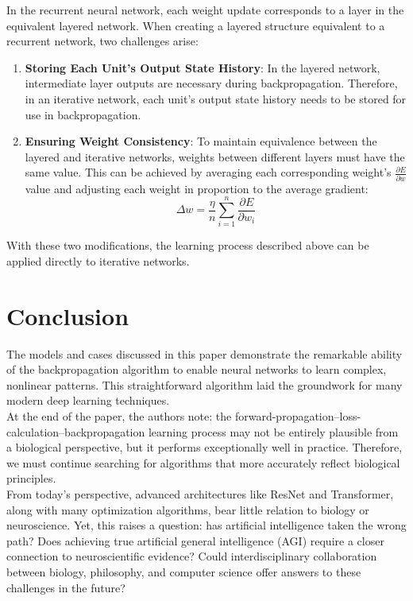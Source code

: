 \documentclass[11p,oneside]{book}
\begin{document}
In the recurrent neural network, each weight update corresponds to a layer in the equivalent layered network. When creating a layered structure equivalent to a recurrent network, two challenges arise:
\begin{enumerate}
    \item \textbf{Storing Each Unit’s Output State History}: In the layered network, intermediate layer outputs are necessary during backpropagation. Therefore, in an iterative network, each unit’s output state history needs to be stored for use in backpropagation.
    \item \textbf{Ensuring Weight Consistency}: To maintain equivalence between the layered and iterative networks, weights between different layers must have the same value. This can be achieved by averaging each corresponding weight’s $\frac{\partial E}{\partial w}$ value and adjusting each weight in proportion to the average gradient:
    $$
    \Delta w = \frac{\eta}{n} \sum_{i=1}^n \frac{\partial E}{\partial w_i}
    $$
\end{enumerate}
With these two modifications, the learning process described above can be applied directly to iterative networks.

\section*{Conclusion}

The models and cases discussed in this paper demonstrate the remarkable ability of the backpropagation algorithm to enable neural networks to learn complex, nonlinear patterns. This straightforward algorithm laid the groundwork for many modern deep learning techniques. \\

At the end of the paper, the authors note: the forward-propagation–loss-calculation–backpropagation learning process may not be entirely plausible from a biological perspective, but it performs exceptionally well in practice. Therefore, we must continue searching for algorithms that more accurately reflect biological principles. \\

From today’s perspective, advanced architectures like ResNet and Transformer, along with many optimization algorithms, bear little relation to biology or neuroscience. Yet, this raises a question: has artificial intelligence taken the wrong path? Does achieving true artificial general intelligence (AGI) require a closer connection to neuroscientific evidence? Could interdisciplinary collaboration between biology, philosophy, and computer science offer answers to these challenges in the future? \\
\end{document}
